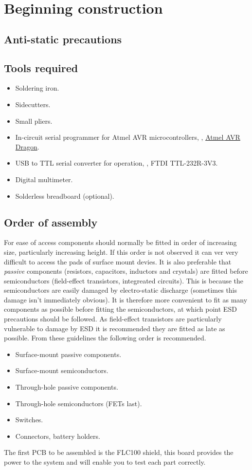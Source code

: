 \chapter{Beginning construction}

\section{Anti-static precautions}

\section{Tools required}

\begin{itemize}
\item Soldering iron.
\item Sidecutters.
\item Small pliers.
\item In-circuit serial programmer for Atmel AVR microcontrollers,
  \eg, \href{http://www.atmel.com/tools/AVRDRAGON.aspx}{Atmel AVR Dragon}.
\item USB to TTL serial converter for  operation, \eg, FTDI
  TTL-232R-3V3.
\item Digital multimeter.
\item Solderless breadboard (optional).
\end{itemize}

\section{Order of assembly}

For ease of access components should normally be fitted in order of
increasing size, particularly increasing height. If this order is not
observed it can ver very difficult to access the pads of surface mount
devies. It is also preferable that \emph{passive} components
(resistors, capacitors, inductors and crystals) are fitted before
semiconductors (field-effect transistors, integreated circuits). This
is because the semiconductors are easily damaged by electro-static
discharge (sometimes this damage isn't immediately obvious). It is
therefore more convenient to fit as many components as possible before
fitting the semiconductors, at which point ESD precautions should be
followed. As field-effect transistors are particularly vulnerable to
damage by ESD it is recommended they are fitted as late as possible.
From these guidelines the following order is recommended.
\begin{itemize}
\item Surface-mount passive components.
\item Surface-mount semiconductors.
\item Through-hole passive components.
\item Through-hole semiconductors (FETs last).
\item Switches.
\item Connectors, battery holders.
\end{itemize}

The first PCB to be assembled is the FLC100 shield, this board
provides the power to the system and will enable you to test each part
correctly.
